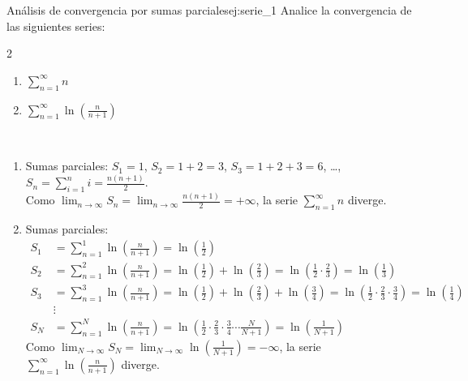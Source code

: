 \begin{example}{Análisis de convergencia por sumas parciales}{ej:serie_1}
    Analice la convergencia de las siguientes series:
    \begin{multicols}{2}
    \begin{enumerate}
        \item $\displaystyle\sum_{n=1}^{\infty} n$
        \item $\displaystyle\sum_{n=1}^{\infty} \ln\left(\frac{n}{n+1}\right)$
    \end{enumerate}
    \end{multicols}
\end{example}

\begin{soln}
    $\left. \right.$
    \begin{enumerate}
        \item Sumas parciales: $S_1 = 1$, $S_2 = 1+2=3$, $S_3 = 1+2+3=6$, \dots, $S_n = \displaystyle\sum_{i=1}^{n}i = \frac{n(n+1)}{2}$.\\
        Como $\displaystyle\lim_{n\to\infty}S_n = \lim_{n\to\infty}\frac{n(n+1)}{2} = +\infty$, la serie $\displaystyle \sum_{n=1}^{\infty}{n}$ diverge.
        
        \item Sumas parciales:
        \begin{align*}
            S_1 &= \sum_{n=1}^{1}\ln\left(\frac{n}{n+1}\right) = \ln\left(\frac{1}{2}\right) \\
            S_2 &= \sum_{n=1}^{2}\ln\left(\frac{n}{n+1}\right) = \ln\left(\frac{1}{2}\right) + \ln\left(\frac{2}{3}\right) = \ln\left(\frac{1}{2}\cdot\frac{2}{3}\right) = \ln\left(\frac{1}{3}\right) \\
            S_3 &= \sum_{n=1}^{3}\ln\left(\frac{n}{n+1}\right) = \ln\left(\frac{1}{2}\right) + \ln\left(\frac{2}{3}\right) + \ln\left(\frac{3}{4}\right) = \ln\left(\frac{1}{2}\cdot\frac{2}{3}\cdot\frac{3}{4}\right) = \ln\left(\frac{1}{4}\right) \\
            &\vdots \\
            S_N &= \sum_{n=1}^{N}\ln\left(\frac{n}{n+1}\right) = \ln\left(\frac{1}{2}\cdot\frac{2}{3}\cdot\frac{3}{4}\cdots\frac{N}{N+1}\right) = \ln\left(\frac{1}{N+1}\right)
        \end{align*}
        Como $\displaystyle\lim_{N\to\infty}S_N = \lim_{N\to\infty}\ln\left(\frac{1}{N+1}\right) = -\infty$, la serie $\displaystyle\sum_{n=1}^{\infty}\ln\left(\frac{n}{n+1}\right)$ diverge.
    \end{enumerate}
\end{soln}

